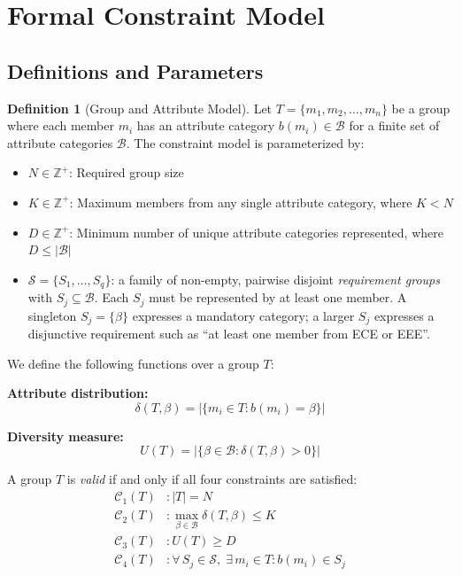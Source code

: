 \documentclass[11pt,a4paper]{article}
\theoremstyle{plain}
\theoremstyle{definition}
\newtheorem{definition}[theorem]{Definition}
\theoremstyle{remark}
\begin{document}
\section{Formal Constraint Model}
\label{sec:constraints}

\subsection{Definitions and Parameters}

\begin{definition}[Group and Attribute Model]
Let $T = \{m_1, m_2, \ldots, m_n\}$ be a group where each member $m_i$ has an attribute category $b(m_i) \in \mathcal{B}$ for a finite set of attribute categories $\mathcal{B}$. The constraint model is parameterized by:
\begin{itemize}[noitemsep,topsep=3pt]
    \item $N \in \mathbb{Z}^+$: Required group size
    \item $K \in \mathbb{Z}^+$: Maximum members from any single attribute category, where $K < N$
    \item $D \in \mathbb{Z}^+$: Minimum number of unique attribute categories represented, where $D \leq |\mathcal{B}|$
    \item $\mathcal{S} = \{S_1, \ldots, S_q\}$: a family of non-empty, pairwise disjoint \emph{requirement groups} with $S_j \subseteq \mathcal{B}$. Each $S_j$ must be represented by at least one member. A singleton $S_j = \{\beta\}$ expresses a mandatory category; a larger $S_j$ expresses a disjunctive requirement such as ``at least one member from ECE or EEE''.
\end{itemize}
\end{definition}

We define the following functions over a group $T$:

\textbf{Attribute distribution:}
\begin{equation}
    \delta(T, \beta) = |\{m_i \in T : b(m_i) = \beta\}|
\end{equation}

\textbf{Diversity measure:}
\begin{equation}
    U(T) = |\{\beta \in \mathcal{B} : \delta(T, \beta) > 0\}|
\end{equation}

A group $T$ is \emph{valid} if and only if all four constraints are satisfied:
\begin{align}
    \mathcal{C}_1(T) &: |T| = N \label{eq:c1} \\
    \mathcal{C}_2(T) &: \max_{\beta \in \mathcal{B}} \delta(T, \beta) \leq K \label{eq:c2} \\
    \mathcal{C}_3(T) &: U(T) \geq D \label{eq:c3} \\
    \mathcal{C}_4(T) &: \forall\, S_j \in \mathcal{S},\; \exists\, m_i \in T : b(m_i) \in S_j \label{eq:c4}
\end{align}
\end{document}

